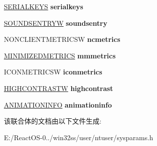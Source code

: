 \begin{DoxyCompactItemize}
\mbox{\label{union___s_p_i_b_u_f_f_e_r_a1bb96a2858f472a1e48dfad7898fe3ac}} 
\hyperlink{structtag_s_e_r_i_a_l_k_e_y_s_a}{S\+E\+R\+I\+A\+L\+K\+E\+YS} {\bfseries serialkeys}
\item 
\mbox{\label{union___s_p_i_b_u_f_f_e_r_a0552d7e53d364a8835d0ef9f1983bd88}} 
\hyperlink{structtag_s_o_u_n_d_s_e_n_t_r_y_w}{S\+O\+U\+N\+D\+S\+E\+N\+T\+R\+YW} {\bfseries soundsentry}
\item 
\mbox{\label{union___s_p_i_b_u_f_f_e_r_ab52d2f40efb0925b2b3ecd408dea6092}} 
N\+O\+N\+C\+L\+I\+E\+N\+T\+M\+E\+T\+R\+I\+C\+SW {\bfseries ncmetrics}
\item 
\mbox{\label{union___s_p_i_b_u_f_f_e_r_a2b48407ea113227d43a7e25460fd6c03}} 
\hyperlink{structtag_m_i_n_i_m_i_z_e_d_m_e_t_r_i_c_s}{M\+I\+N\+I\+M\+I\+Z\+E\+D\+M\+E\+T\+R\+I\+CS} {\bfseries mmmetrics}
\item 
\mbox{\label{union___s_p_i_b_u_f_f_e_r_a9235a42d8d8b3117abed07999efabd15}} 
I\+C\+O\+N\+M\+E\+T\+R\+I\+C\+SW {\bfseries iconmetrics}
\item 
\mbox{\label{union___s_p_i_b_u_f_f_e_r_a6931f544cf08e1549a76c353d937ad1d}} 
\hyperlink{structtag_h_i_g_h_c_o_n_t_r_a_s_t_w}{H\+I\+G\+H\+C\+O\+N\+T\+R\+A\+S\+TW} {\bfseries highcontrast}
\item 
\mbox{\label{union___s_p_i_b_u_f_f_e_r_a309386523b0f072bfd0b07916bbf6778}} 
\hyperlink{structtag_a_n_i_m_a_t_i_o_n_i_n_f_o}{A\+N\+I\+M\+A\+T\+I\+O\+N\+I\+N\+FO} {\bfseries animationinfo}
\end{DoxyCompactItemize}


该联合体的文档由以下文件生成\+:\begin{DoxyCompactItemize}
\item 
E\+:/\+React\+O\+S-\/0../win32ss/user/ntuser/sysparams.\+h\end{DoxyCompactItemize}
